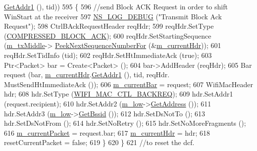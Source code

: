 \begin{DoxyCode}
      \hyperlink{classns3_1_1WifiMacHeader_a5ddcfd82e7c5a17ffea5be9246544530}{GetAddr1} (), tid))
595             \{
596               \textcolor{comment}{//send Block ACK Request in order to shift WinStart at the receiver}
597               \hyperlink{group__logging_ga413f1886406d49f59a6a0a89b77b4d0a}{NS\_LOG\_DEBUG} (\textcolor{stringliteral}{"Transmit Block Ack Request"});
598               CtrlBAckRequestHeader reqHdr;
599               reqHdr.SetType (\hyperlink{namespacens3_a90f436472d19d7d7f37cbf0b8c288ff7ad325114ff6e0d84c1d4cea5bd810a48c}{COMPRESSED\_BLOCK\_ACK});
600               reqHdr.SetStartingSequence (\hyperlink{classns3_1_1DcaTxop_a605ac1de505d652e229d14a9e75c7b1a}{m\_txMiddle}->
      \hyperlink{classns3_1_1MacTxMiddle_a9ae98e7d98efae080431b7fe3b0a9a2d}{PeekNextSequenceNumberFor} (&\hyperlink{classns3_1_1DcaTxop_ae965eb2f4d504e00526e751cd1dab3a6}{m\_currentHdr}));
601               reqHdr.SetTidInfo (tid);
602               reqHdr.SetHtImmediateAck (\textcolor{keyword}{true});
603               Ptr<Packet> bar = Create<Packet> ();
604               bar->AddHeader (reqHdr);
605               Bar request (bar, \hyperlink{classns3_1_1DcaTxop_ae965eb2f4d504e00526e751cd1dab3a6}{m\_currentHdr}.\hyperlink{classns3_1_1WifiMacHeader_a5ddcfd82e7c5a17ffea5be9246544530}{GetAddr1} (), tid, reqHdr.
      MustSendHtImmediateAck ());
606               \hyperlink{classns3_1_1EdcaTxopN_a8500ea69876682da40eab4222b7066c5}{m\_currentBar} = request;
607               WifiMacHeader hdr;
608               hdr.SetType (\hyperlink{namespacens3_a9318472db39b35b2092de5c721e6ab0aa1b3c29e4b46847a71ad8f3b45c747456}{WIFI\_MAC\_CTL\_BACKREQ});
609               hdr.SetAddr1 (request.recipient);
610               hdr.SetAddr2 (\hyperlink{classns3_1_1DcaTxop_a76de11e512290acc37c9863f7ab17758}{m\_low}->\hyperlink{classns3_1_1MacLow_a109922d4f2bb1ee0b2a66aa3bcc48e2f}{GetAddress} ());
611               hdr.SetAddr3 (\hyperlink{classns3_1_1DcaTxop_a76de11e512290acc37c9863f7ab17758}{m\_low}->\hyperlink{classns3_1_1MacLow_a4d11b37c976a0bac9d123fcc4b1fb9e6}{GetBssid} ());
612               hdr.SetDsNotTo ();
613               hdr.SetDsNotFrom ();
614               hdr.SetNoRetry ();
615               hdr.SetNoMoreFragments ();
616               \hyperlink{classns3_1_1DcaTxop_a3c454c21337aac0944f86caad8b7a719}{m\_currentPacket} = request.bar;
617               \hyperlink{classns3_1_1DcaTxop_ae965eb2f4d504e00526e751cd1dab3a6}{m\_currentHdr} = hdr;
618               resetCurrentPacket = \textcolor{keyword}{false};
619             \}
620         \}
621       \textcolor{comment}{//to reset the dcf.}

\end{DoxyCode}
